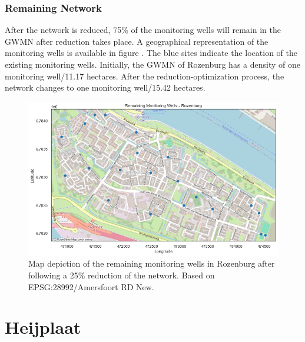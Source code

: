 \clearpage

\subsubsection{Remaining Network}
After the network is reduced, 75\% of the monitoring wells will remain in the GWMN after reduction takes place. A geographical representation of the monitoring wells is available in figure . The blue sites indicate the location of the existing monitoring wells. Initially, the GWMN of Rozenburg has a density of one monitoring well/11.17 hectares. After the reduction-optimization process, the network changes to one monitoring well/15.42 hectares.

\begin{figure}[htbp]
    \centering
    \includegraphics[width=1\linewidth]{frontmatter/Rozenburg-fig/newrem.png}
    \caption{Map depiction of the remaining monitoring wells in Rozenburg after following a 25\% reduction of the network. Based on EPSG:28992/Amersfoort RD New.}
    \label{afterroz}
    
\end{figure}

\clearpage

\section{Heijplaat}
